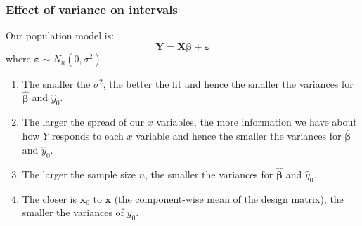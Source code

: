 \documentclass[a4paper]{article}
\begin{document}
\subsubsection{Effect of variance on intervals}
Our population model is:
\[
	\symbf{Y} = \symbf{X}\symbf{\beta} + \symbf{\varepsilon}
\]
where \( \symbf{\varepsilon} \sim N_n (0,\sigma^2) \).
\begin{enumerate}
	\item The smaller the \( \sigma^2 \), the better the fit and hence the smaller the variances for \( \hat{\symbf{\beta}} \) and \( \hat{y}_0 \).
	\item The larger the spread of our \( x \) variables, the more information we have about how \( Y \) responds to each \( x \) variable and hence the smaller the variances for \( \hat{\symbf{\beta}} \) and \( \hat{y}_0 \).
	\item The larger the sample size \( n \), the smaller the variances for \( \hat{\symbf{\beta}} \) and \( \hat{y}_0 \).
	\item The closer is \( \symbf{x}_0 \) to \( \overline{\symbf{x}} \)  (the component-wise mean of the design matrix), the smaller the variances of \( \hat{y}_0 \).
\end{enumerate}
\end{document}
